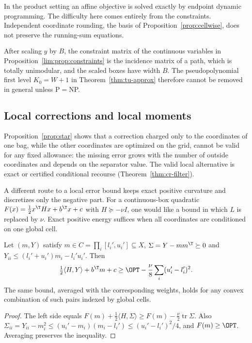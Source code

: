 In the product setting an affine objective is solved exactly by endpoint
dynamic programming. The difficulty here comes entirely from the
constraints. Independent coordinate rounding, the basis of
Proposition~\ref{prop:cellwise}, does not preserve the running-sum equations.


After scaling $y$ by $B$, the constraint matrix of the continuous variables in
Proposition~\ref{lim:prop:constraints} is the incidence matrix of a path,
which is totally unimodular, and the scaled boxes have width $B$. The
pseudopolynomial first level $K_0=W+1$ in Theorem~\ref{thm:tu-approx} therefore
cannot be removed in general unless P${}={}$NP.

\subsection{Local corrections and local moments}\label{sec:limits-local}
Proposition~\ref{prop:star} shows that a correction charged only to the
coordinates of one bag, while the other coordinates are optimized on the
grid, cannot be valid for any fixed allowance: the missing error grows with
the number of outside coordinates and depends on the separator value. The
valid local alternative is exact or certified conditional recourse
(Theorem~\ref{thm:cr-filter}).

A different route to a local error bound keeps exact positive curvature and
discretizes only the negative part. For a continuous-box quadratic
$F(x)=\frac12x^\T Hx+b^\T x+c$ with $H\succeq-\nu I$, one would like a bound
in which $L$ is replaced by $\nu$. Exact positive energy suffices when all
coordinates are conditioned on one global cell.

\begin{lemma}\label{lim:lem:mixture}
Let $(m,Y)$ satisfy $m\in C=\prod_i[l_i',u_i']\subseteq X$,
$\Sigma=Y-mm^\T\succeq0$ and $Y_{ii}\le(l_i'+u_i')m_i-l_i'u_i'$. Then
\[
\tfrac12\langle H,Y\rangle+b^\T m+c\ge\OPT-\frac\nu8\sum_i(u_i'-l_i')^2 .
\]
The same bound, averaged with the corresponding weights, holds for any
convex combination of such pairs indexed by global cells.
\end{lemma}

\begin{proof}
The left side equals
$F(m)+\frac12\langle H,\Sigma\rangle\ge F(m)-\frac\nu2\operatorname{tr}\Sigma$.
Also $\Sigma_{ii}=Y_{ii}-m_i^2\le(u_i'-m_i)(m_i-l_i')\le(u_i'-l_i')^2/4$, and
$F(m)\ge\OPT$. Averaging preserves the inequality.
\end{proof}

